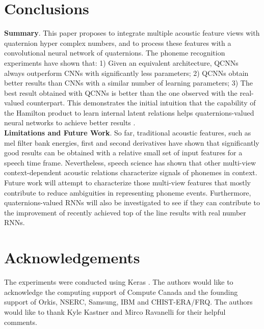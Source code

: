 \documentclass[a4paper]{article}
\begin{document}
\section{Conclusions}
\textbf{Summary}.
This paper proposes to integrate multiple acoustic feature views with quaternion hyper complex numbers, and to process these features with a convolutional neural network of quaternions. The phoneme recognition experiments have shown that: 1) Given an equivalent architecture, QCNNs always outperform CNNs with significantly less parameters; 2) QCNNs obtain better results than CNNs with a similar number of learning parameters; 3) The best result obtained with QCNNs is better than the one observed with the real-valued counterpart. This demonstrates the initial intuition that the capability of the Hamilton product to learn internal latent relations helps quaternions-valued neural networks to achieve better results .\\   
\textbf{Limitations and Future Work}.
So far, traditional acoustic features, such as mel filter bank energies, first and second derivatives have shown that significantly good results can be obtained with a relative small set of input features for a speech time frame. Nevertheless, speech science has shown that other multi-view context-dependent acoustic relations characterize signals of phonemes in context.
Future work will attempt to characterize those multi-view features that mostly contribute to reduce ambiguities in representing phoneme events. Furthermore, quaternions-valued RNNs will also be investigated to see if they can contribute to the improvement of recently achieved top of the line results with real number RNNs.





\section{Acknowledgements}
The experiments were conducted using Keras \cite{chollet2015keras}. The authors would like to acknowledge the computing support of Compute Canada and the founding support of Orkis, NSERC, Samsung, IBM and CHIST-ERA/FRQ. The authors would like to thank Kyle Kastner and Mirco Ravanelli for their helpful comments.   

\newpage




\end{document}
